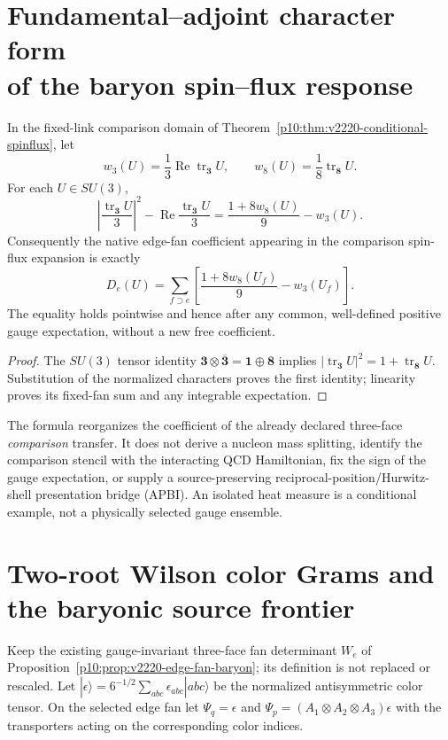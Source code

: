 \documentclass[12pt,a4paper]{article}
\begin{document}
\section[Fundamental--adjoint character form of the baryon spin--flux response]{Fundamental--adjoint character form\\of the baryon spin--flux response}
\label{p10:sec:v357-spinflux-wilson}
\begin{proposition}
\label{p10:prop:v357-spinflux-wilson-contrast}
In the fixed-link comparison domain of
Theorem~\ref{p10:thm:v2220-conditional-spinflux}, let
\[
 w_3(U)=\frac13\operatorname{Re}\operatorname{tr}_{\mathbf3}U,
 \qquad w_8(U)=\frac18\operatorname{tr}_{\mathbf8}U.
\]
For each $U\in SU(3)$,
\[
 \left|\frac{\operatorname{tr}_{\mathbf3}U}{3}\right|^2
  -\operatorname{Re}\frac{\operatorname{tr}_{\mathbf3}U}{3}
 =\frac{1+8w_8(U)}9-w_3(U).
\]
Consequently the native edge-fan coefficient appearing in the
comparison spin-flux expansion is exactly
\[
 \boxed{D_e(U)=\sum_{f\supset e}
 \left[\frac{1+8w_8(U_f)}9-w_3(U_f)\right].}
\]
The equality holds pointwise and hence after any common, well-defined
positive gauge expectation, without a new free coefficient.
\end{proposition}
\begin{proof}
The $SU(3)$ tensor identity
$\mathbf3\otimes\overline{\mathbf3}=\mathbf1\oplus\mathbf8$
implies
$|\operatorname{tr}_{\mathbf3}U|^2=1+\operatorname{tr}_{\mathbf8}U$.
Substitution of the normalized characters proves the first identity;
linearity proves its fixed-fan sum and any integrable expectation.
\end{proof}
\begin{remark}
\label{p10:rem:v357-spinflux-wilson-scope}
The formula reorganizes the coefficient of the already declared
three-face \emph{comparison} transfer. It does not derive a nucleon
mass splitting, identify the comparison stencil with the interacting
QCD Hamiltonian, fix the sign of the gauge expectation, or supply a
source-preserving reciprocal-position/Hurwitz-shell presentation
bridge (APBI). An isolated heat measure is a conditional example,
not a physically selected gauge ensemble.
\end{remark}


\section{Two-root Wilson color Grams and the baryonic source frontier}
\label{p10:sec:v365-wilson-gram-apbi}
Keep the existing gauge-invariant three-face fan determinant
$W_e$ of Proposition~\ref{p10:prop:v2220-edge-fan-baryon};
its definition is not replaced or rescaled.  Let
$|\epsilon\rangle=6^{-1/2}\sum_{abc}\epsilon_{abc}|abc\rangle$
be the normalized antisymmetric color tensor.  On the selected
edge fan let $\Psi_q=\epsilon$ and
$\Psi_p=(A_1\otimes A_2\otimes A_3)\epsilon$ with the
transporters acting on the corresponding color indices.
\end{document}
